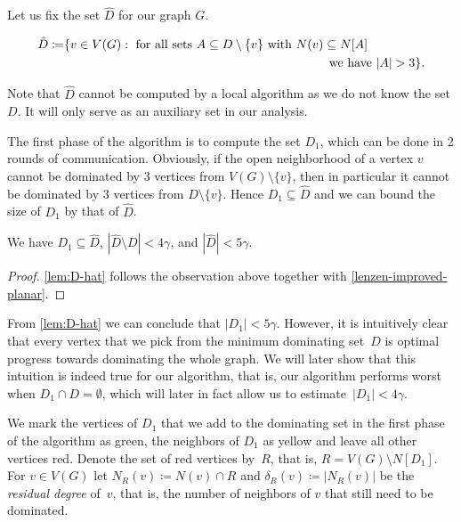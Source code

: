 Let us fix the set $\hat{D}$ for our graph $G$.
\begin{tcolorbox}
\vspace{-4mm}
    \begin{align*}
      \hat D\coloneqq & \{v\in V(G) : \text{ for all sets } A\subseteq D\setminus \{v\}
       \text{ with $N(v)\subseteq N[A]$}\\ 
  & \hspace{7.5cm}\text{we have $|A|> 3\}$.}
  \end{align*}
\end{tcolorbox}
\smallskip

Note that $\hat{D}$ cannot be computed by a local algorithm as we do
not know the set $D$. It will only serve as an auxiliary set in our
analysis.

\smallskip The first phase of the algorithm is to compute the set
$D_1$, which can be done in 2 rounds of communication. Obviously, if
the open neighborhood of a vertex $v$ cannot be dominated by $3$
vertices from $V(G)\setminus\{v\}$, then in particular it cannot be
dominated by $3$ vertices from $D\setminus\{v\}$.  Hence
$D_1\subseteq \hat{D}$ and we can bound the size of $D_1$ by that of
$\hat{D}$.

\smallskip
\begin{lemma}\label{lem:D-hat}
  We have $D_1\subseteq \hat D$, $|\hat{D}\setminus D|< 4\gamma$, and
  $|\hat{D}|< 5\gamma$.
\end{lemma}
\begin{proof}
  \cref{lem:D-hat} follows the observation above together with
  \cref{lenzen-improved-planar}.
\end{proof}

From \cref{lem:D-hat} we can conclude that $|D_1|< 5\gamma$. However,
it is intuitively clear that every vertex that we pick from the
minimum dominating set~$D$ is optimal progress towards dominating the
whole graph. We will later show that this intuition is indeed true for
our algorithm, that is, our algorithm performs worst when
$D_1\cap D=\emptyset$, which will later in fact allow us to
estimate~$|D_1|<4\gamma$.

\smallskip

We mark the vertices of $D_1$ that we add to the dominating set in the
first phase of the algorithm as green, the neighbors of $D_1$ as
yellow and leave all other vertices red. Denote the set of red
vertices by~$R$, that is, $R=V(G)\setminus N[D_1]$.  For $v\in V(G)$
let $N_R(v)\coloneqq N(v)\cap R$ and $\delta_R(v)\coloneqq |N_R(v)|$
be the \emph{residual degree} of~$v$, that is, the number of neighbors
of $v$ that still need to be dominated.

